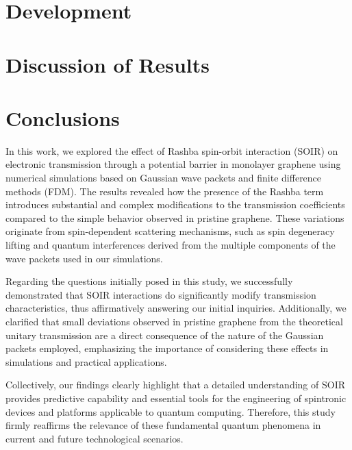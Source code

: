 \documentclass[twocolumn, aps, prb, 10pt]{revtex4-2}
\begin{document}


    \section{Development}\label{sec:development}
    


    \section{Discussion of Results}\label{sec:discussion-of-results}
    


    \section{Conclusions}\label{sec:conclusions}

    In this work, we explored the effect of Rashba spin-orbit interaction (SOIR) on electronic transmission through a potential barrier in monolayer graphene using numerical simulations based on Gaussian wave packets and finite difference methods (FDM). The results revealed how the presence of the Rashba term introduces substantial and complex modifications to the transmission coefficients compared to the simple behavior observed in pristine graphene.
    These variations originate from spin-dependent scattering mechanisms, such as spin degeneracy lifting and quantum interferences derived from the multiple components of the wave packets used in our simulations.

    Regarding the questions initially posed in this study, we successfully demonstrated that SOIR interactions do significantly modify transmission characteristics, thus affirmatively answering our initial inquiries.
    Additionally, we clarified that small deviations observed in pristine graphene from the theoretical unitary transmission are a direct consequence of the nature of the Gaussian packets employed, emphasizing the importance of considering these effects in simulations and practical applications.

    Collectively, our findings clearly highlight that a detailed understanding of SOIR provides predictive capability and essential tools for the engineering of spintronic devices and platforms applicable to quantum computing.
    Therefore, this study firmly reaffirms the relevance of these fundamental quantum phenomena in current and future technological scenarios.
    \pagebreak


    
    
\end{document}
